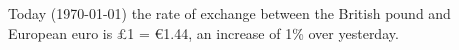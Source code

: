 \documentclass{article}
\begin{document}
Today (\today) the rate of exchange between the British pound
and European euro is \pounds 1 = \euro1.44, an increase of 1\%
over yesterday.
\end{document}

